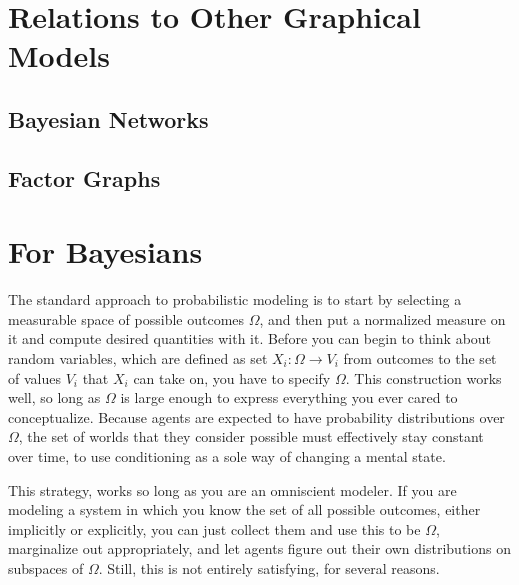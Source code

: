 \documentclass{article}
\begin{document}
	

	
	\section{Relations to Other Graphical Models}
	\subsection{Bayesian Networks}
	\subsection{Factor Graphs}
	
	\section{For Bayesians}
	
	The standard approach to probabilistic modeling is to start by selecting a measurable space of possible outcomes $\Omega$, and then put a normalized measure on it and compute desired quantities with it. Before you can begin to think about random variables, which are defined as set $X_i : \Omega \to V_i$ from outcomes to the set of values $V_i$ that $X_i$ can take on, you have to specify $\Omega$. This construction works well, so long as $\Omega$ is large enough to express everything you ever cared to conceptualize. Because agents are expected to have probability distributions over $\Omega$, the set of worlds that they consider possible must effectively stay constant over time, to use conditioning as a sole way of changing a mental state.
	
	
	This strategy, works so long as you are an omniscient modeler. If you are modeling a system in which you know the set of all possible outcomes, either implicitly or explicitly, you can just collect them and use this to be $\Omega$, marginalize out appropriately, and let agents figure out their own distributions on subspaces of $\Omega$. Still, this is not entirely satisfying, for several reasons.
	
\end{document}
